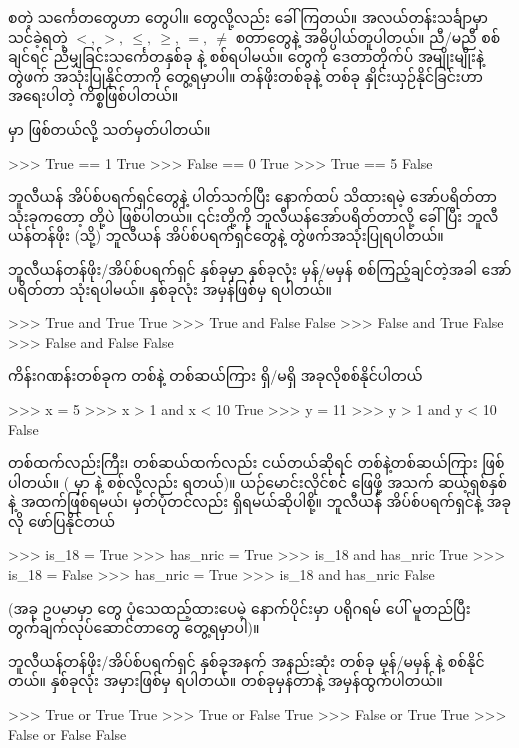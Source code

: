 \fCode{<}\fEn{,} \fCode{>}\fEn{,} \fCode{<=}\fEn{,} \fCode{>=}\fEn{,} \fCode{==}\fEn{,} \fCode{!=} စတဲ့ သင်္ကေတတွေဟာ  တွေပါ။  တွေလို့လည်း ခေါ်ကြတယ်။ အလယ်တန်းသင်္ချာမှာ သင်ခဲ့ရတဲ့ \(<,\ >,\ \leq,\ \geq,\ =,\ \neq \) စတာတွေနဲ့ အဓိပ္ပါယ်တူပါတယ်။ ညီ/မညီ စစ်ချင်ရင် ညီမျှခြင်းသင်္ကေတနှစ်ခု \fCode{==} နဲ့ စစ်ရပါမယ်။  တွေကို ဒေတာတိုက်ပ် အမျိုးမျိုးနဲ့ တွဲဖက် အသုံးပြုနိုင်တာကို တွေ့ရမှာပါ။ တန်ဖိုးတစ်ခုနဲ့ တစ်ခု နှိုင်းယှဉ်နိုင်ခြင်းဟာ အရေးပါတဲ့ ကိစ္စဖြစ်ပါတယ်။


 မှာ \fEn{,}  ဖြစ်တယ်လို့ သတ်မှတ်ပါတယ်။
\begin{codetxt}
>>> True == 1
True
>>> False == 0
True
>>> True == 5
False
\end{codetxt}



ဘူလီယန် အိပ်စ်ပရက်ရှင်တွေနဲ့ ပါတ်သက်ပြီး နောက်ထပ် သိထားရမဲ့ အော်ပရိတ်တာ သုံးခုကတော့ \fEn{,} \fEn{,}  တို့ပဲ ဖြစ်ပါတယ်။ ၎င်းတို့ကို ဘူလီယန်အော်ပရိတ်တာလို့ ခေါ်ပြီး ဘူလီယန်တန်ဖိုး (သို့) ဘူလီယန် အိပ်စ်ပရက်ရှင်တွေနဲ့ တွဲဖက်အသုံးပြုရပါတယ်။ 

ဘူလီယန်တန်ဖိုး/အိပ်စ်ပရက်ရှင် နှစ်ခုမှာ နှစ်ခုလုံး မှန်/မမှန် စစ်ကြည့်ချင်တဲ့အခါ  အော်ပရိတ်တာ သုံးရပါမယ်။ နှစ်ခုလုံး အမှန်ဖြစ်မှ  ရပါတယ်။
\begin{codetxt}
>>> True and True
True
>>> True and False
False
>>> False and True
False
>>> False and False
False
\end{codetxt}

ကိန်းဂဏန်းတစ်ခုက တစ်နဲ့ တစ်ဆယ်ကြား ရှိ/မရှိ အခုလိုစစ်နိုင်ပါတယ်
\begin{codetxt}
>>> x = 5
>>> x > 1 and x < 10
True
>>> y = 11
>>> y > 1 and y < 10
False
\end{codetxt}
တစ်ထက်လည်းကြီး၊ တစ်ဆယ်ထက်လည်း ငယ်တယ်ဆိုရင် တစ်နဲ့တစ်ဆယ်ကြား ဖြစ်ပါတယ်။ ( မှာ  နဲ့ စစ်လို့လည်း ရတယ်)။ ယဉ်မောင်းလိုင်စင် ဖြေဖို့ အသက် ဆယ့်ရှစ်နှစ်နဲ့ အထက်ဖြစ်ရမယ်၊ မှတ်ပုံတင်လည်း ရှိရမယ်ဆိုပါစို့။ ဘူလီယန် အိပ်စ်ပရက်ရှင်နဲ့ အခုလို ဖော်ပြနိုင်တယ်
\begin{codetxt}
>>> is_18 = True 
>>> has_nric = True 
>>> is_18 and has_nric
True
>>> is_18 = False 
>>> has_nric = True 
>>> is_18 and has_nric
False 
\end{codetxt}
(အခု ဥပမာမှာ  တွေ ပုံသေထည့်ထားပေမဲ့ နောက်ပိုင်းမှာ ပရိုဂရမ်  ပေါ် မူတည်ပြီး တွက်ချက်လုပ်ဆောင်တာတွေ တွေ့ရမှာပါ)။ 

ဘူလီယန်တန်ဖိုး/အိပ်စ်ပရက်ရှင် နှစ်ခုအနက် အနည်းဆုံး တစ်ခု မှန်/မမှန်  နဲ့ စစ်နိုင်တယ်။ နှစ်ခုလုံး အမှားဖြစ်မှ  ရပါတယ်။ တစ်ခုမှန်တာနဲ့ အမှန်ထွက်ပါတယ်။
\begin{codetxt}
>>> True or True
True
>>> True or False
True
>>> False or True
True
>>> False or False
False
\end{codetxt}

